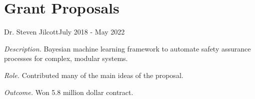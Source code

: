 \documentclass[10pt]{article}
\begin{document}
\section{Grant Proposals}
		{Dr. Steven Jilcott}{July 2018 - May 2022}
		{\begin{itemize-noindent}
			\item{\textit{Description.} Bayesian machine learning framework to automate safety assurance processes for complex, modular systems.}
			\item{\textit{Role.} Contributed many of the main ideas of the proposal.}
			\item{\textit{Outcome.} Won 5.8 million dollar contract.}
	\end{itemize-noindent}}
\end{document}
